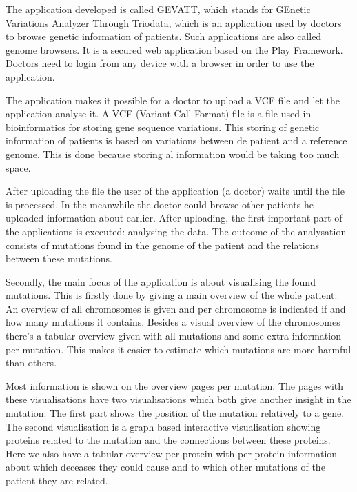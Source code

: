 The application developed is called GEVATT, which stands for GEnetic Variations Analyzer Through Triodata, which is an application used by doctors to browse genetic information of patients. Such applications are also called genome browsers. It is a secured web application based on the Play Framework. Doctors need to login from any device with a browser in order to use the application.

The application makes it possible for a doctor to upload a VCF file and let the application analyse it. A VCF (Variant Call Format) file is a file used in bioinformatics for storing gene sequence variations. This storing of genetic information of patients is based on variations between de patient and a reference genome. This is done because storing al information would be taking too much space.

After uploading the file the user of the application (a doctor) waits until the file is processed. In the meanwhile the doctor could browse other patients he uploaded information about earlier. After uploading, the first important part of the applications is executed: analysing the data. The outcome of the analysation consists of mutations found in the genome of the patient and the relations between these mutations.

Secondly, the main focus of the application is about visualising the found mutations. This is firstly done by giving a main overview of the whole patient. An overview of all chromosomes is given and per chromosome is indicated if and how many mutations it contains. Besides a visual overview of the chromosomes there's a tabular overview given with all mutations and some extra information per mutation. This makes it easier to estimate which mutations are more harmful than others.

Most information is shown on the overview pages per mutation. The pages with these visualisations have two visualisations which both give another insight in the mutation. The first part shows the position of the mutation relatively to a gene. The second visualisation is a graph based interactive visualisation showing proteins related to the mutation and the connections between these proteins. Here we also have a tabular overview per protein with per protein information about which deceases they could cause and to which other mutations of the patient they are related.